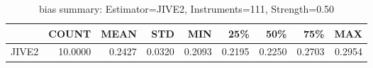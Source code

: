 \begin{table}[ht]
\centering
\caption{bias summary: Estimator=JIVE2, Instruments=111, Strength=0.50}
\begin{tabular}{lrrrrrrrr}
\toprule
 & COUNT & MEAN & STD & MIN & 25\% & 50\% & 75\% & MAX \\
\midrule
JIVE2 & 10.0000 & 0.2427 & 0.0320 & 0.2093 & 0.2195 & 0.2250 & 0.2703 & 0.2954 \\
\bottomrule
\end{tabular}
\end{table}
